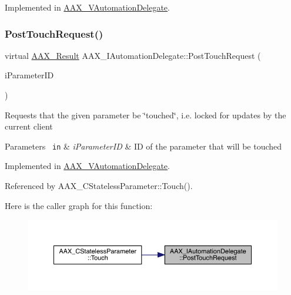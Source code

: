 Implemented in \mbox{\hyperlink{a01893_a3c2c9825150df103bca6c1e740a01fdb}{A\+A\+X\+\_\+\+V\+Automation\+Delegate}}.

\mbox{\label{a01773_a30fdb67042b8dc9fb42fa9023ed9cce0}} 
\subsubsection{\texorpdfstring{PostTouchRequest()}{PostTouchRequest()}}
{\footnotesize\ttfamily virtual \mbox{\hyperlink{a00392_a4d8f69a697df7f70c3a8e9b8ee130d2f}{A\+A\+X\+\_\+\+Result}} A\+A\+X\+\_\+\+I\+Automation\+Delegate\+::\+Post\+Touch\+Request (\begin{DoxyParamCaption}\item[{\mbox{\hyperlink{a00392_a1440c756fe5cb158b78193b2fc1780d1}{A\+A\+X\+\_\+\+C\+Param\+ID}}}]{i\+Parameter\+ID }\end{DoxyParamCaption})\hspace{0.3cm}{\ttfamily [pure virtual]}}

Requests that the given parameter be \char`\"{}touched\char`\"{}, i.\+e. locked for updates by the current client


\begin{DoxyParams}[1]{Parameters}
\mbox{\texttt{ in}}  & {\em i\+Parameter\+ID} & ID of the parameter that will be touched \\
\hline
\end{DoxyParams}


Implemented in \mbox{\hyperlink{a01893_a2941ee0db1ec78047f389090c75d3835}{A\+A\+X\+\_\+\+V\+Automation\+Delegate}}.



Referenced by A\+A\+X\+\_\+\+C\+Stateless\+Parameter\+::\+Touch().

Here is the caller graph for this function\+:
\nopagebreak
\begin{figure}[H]
\begin{center}
\leavevmode
\includegraphics[width=350pt]{a01773_a30fdb67042b8dc9fb42fa9023ed9cce0_icgraph}
\end{center}
\end{figure}
\mbox{\label{a01773_a89049fae2c35a4b99cfeb6585898bb69}} 
